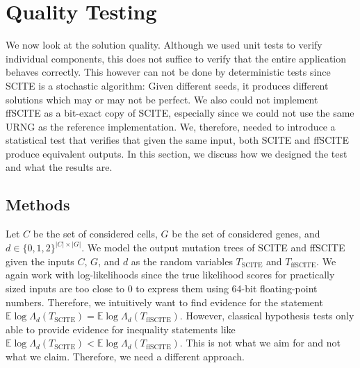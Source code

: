 \section{Quality Testing}

We now look at the solution quality. Although we used unit tests to verify individual components, this does not suffice to verify that the entire application behaves correctly. This however can not be done by deterministic tests since \ac{SCITE} is a stochastic algorithm: Given different seeds, it produces different solutions which may or may not be perfect. We also could not implement \ac{ffSCITE} as a bit-exact copy of \ac{SCITE}, especially since we could not use the same \ac{URNG} as the reference implementation. We, therefore, needed to introduce a statistical test that verifies that given the same input, both \ac{SCITE} and \ac{ffSCITE} produce equivalent outputs. In this section, we discuss how we designed the test and what the results are.

\subsection{Methods}

Let $C$ be the set of considered cells, $G$ be the set of considered genes, and $d \in \{0,1,2\}^{|C| \times |G|}$. We model the output mutation trees of \ac{SCITE} and \ac{ffSCITE} given the inputs $C$, $G$, and $d$ as the random variables $T_\mathrm{SCITE}$ and $T_\mathrm{ffSCITE}$. We again work with log-likelihoods since the true likelihood scores for practically sized inputs are too close to 0 to express them using 64-bit floating-point numbers. Therefore, we intuitively want to find evidence for the statement $\mathbb{E} \log\Lambda_d(T_\mathrm{SCITE}) = \mathbb{E} \log\Lambda_d(T_\mathrm{ffSCITE})$. However, classical hypothesis tests only able to provide evidence for inequality statements like $\mathbb{E} \log\Lambda_d(T_\mathrm{SCITE}) < \mathbb{E} \log\Lambda_d(T_\mathrm{ffSCITE})$. This is not what we aim for and not what we claim. Therefore, we need a different approach.

